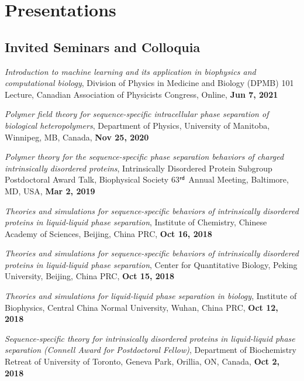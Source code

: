 \documentclass[11pt]{../yhlcv}
\begin{document}
\section*{Presentations}

\subsection*{Invited Seminars and Colloquia}

\begin{etaremune}[leftmargin=0.26in]

\item {\it Introduction to machine learning and its application in biophysics and computational biology}, Division of Physics in Medicine and Biology (DPMB) 101 Lecture, Canadian Association of Physicists Congress, Online, {\bf Jun 7, 2021}

\item {\it Polymer field theory for sequence-specific intracellular phase separation of biological heteropolymers}, Department of Physics, University of Manitoba, Winnipeg, MB, Canada, {\bf Nov 25, 2020}

\item {\it Polymer theory for the sequence-specific phase separation behaviors of charged intrinsically disordered proteins}, Intrinsically Disordered Protein Subgroup Postdoctoral Award Talk, Biophysical Society 63$^{\sf rd}$  Annual Meeting, Baltimore, MD, USA, {\bf Mar 2, 2019}

\item {\it Theories and simulations for sequence-specific behaviors of intrinsically disordered proteins in liquid-liquid phase separation}, Institute of Chemistry, Chinese Academy of Sciences, Beijing, China PRC, {\bf Oct 16, 2018}

\item {\it Theories and simulations for sequence-specific behaviors of intrinsically disordered proteins in liquid-liquid phase separation}, Center for Quantitative Biology, Peking University, Beijing, China PRC, {\bf Oct 15, 2018}

\item {\it Theories and simulations for liquid-liquid phase separation in biology}, Institute of Biophysics, Central China Normal University, Wuhan, China PRC, {\bf Oct 12, 2018}

\item {\it Sequence-specific theory for intrinsically disordered proteins in liquid-liquid phase separation (Connell Award for Postdoctoral Fellow)}, Department of Biochemistry Retreat of University of Toronto, Geneva Park, Orillia, ON, Canada, {\bf Oct 2, 2018}


\end{etaremune}
\end{document}
